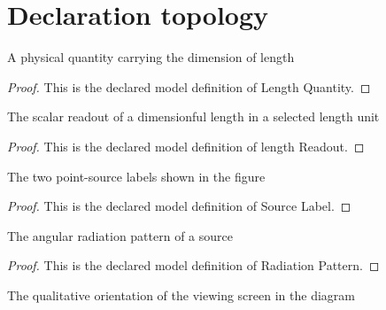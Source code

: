 \section{Declaration topology}
\begin{definition}
  \label{def:physics:phyx-mini-0090:phyxminiproblems-problemphyxmini0090-lengthquantity}
  A physical quantity carrying the dimension of length
\end{definition}
\begin{proof}
  This is the declared model definition of Length Quantity.
\end{proof}
\begin{definition}
  \label{def:physics:phyx-mini-0090:phyxminiproblems-problemphyxmini0090-lengthreadout}
  The scalar readout of a dimensionful length in a selected length unit
\end{definition}
\begin{proof}
  This is the declared model definition of length Readout.
\end{proof}
\begin{definition}
  \label{def:physics:phyx-mini-0090:phyxminiproblems-problemphyxmini0090-sourcelabel}
  The two point-source labels shown in the figure
\end{definition}
\begin{proof}
  This is the declared model definition of Source Label.
\end{proof}
\begin{definition}
  \label{def:physics:phyx-mini-0090:phyxminiproblems-problemphyxmini0090-radiationpattern}
  The angular radiation pattern of a source
\end{definition}
\begin{proof}
  This is the declared model definition of Radiation Pattern.
\end{proof}
\begin{definition}
  \label{def:physics:phyx-mini-0090:phyxminiproblems-problemphyxmini0090-screenorientation}
  The qualitative orientation of the viewing screen in the diagram
\end{definition}
